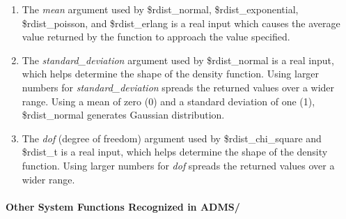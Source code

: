 \begin{description}
\begin{enumerate}
\item{The {\it mean} argument used by {\vt \$rdist\_normal}, {\vt
\$rdist\_exponential}, {\vt \$rdist\_poisson}, and {\vt
\$rdist\_erlang} is a real input which causes the average value
returned by the function to approach the value specified.}

\item{The {\it standard\_deviation} argument used by {\vt
\$rdist\_normal} is a real input, which helps determine the shape of
the density function.  Using larger numbers for {\it
standard\_deviation} spreads the returned values over a wider range. 
Using a mean of zero (0) and a standard deviation of one (1), {\vt
\$rdist\_normal} generates Gaussian distribution.}

\item{The {\it dof} (degree of freedom) argument used by {\vt
\$rdist\_chi\_square} and {\vt \$rdist\_t} is a real input, which
helps determine the shape of the density function.  Using larger
numbers for {\it dof} spreads the returned values over a wider range.}
\end{enumerate}
\end{description}

\paragraph{Other System Functions Recognized in ADMS/{\WRspice}}

